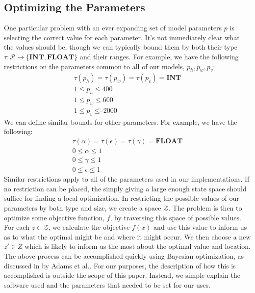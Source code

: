 \documentclass[letterpaper]{article}
\begin{document}
\subsection{Optimizing the Parameters}
\label{sec:bayes_opt}
One particular problem with an ever expanding set of model parameters $p$ is selecting the correct value for each parameter. It's not immediately clear what the values should be, though we can typically bound them by both their type $\tau: \mathcal{P} \to \{\textbf{INT}, \textbf{FLOAT} \}$ and their ranges. For example, we have the following restrictions on the parameters common to all of our models, $p_h,p_w,p_v$:
\begin{align}
\tau(p_h) = \tau(p_w) = \tau(p_v) = \textbf{INT} \\
1 \leq p_h \leq 400 \\
1 \leq p_w \leq 600 \\
1 \leq p_v \leq \tilde~ 2000
\end{align}
We can define similar bounds for other parameters. For example, we have the following:
\begin{align}
\tau(\alpha) = \tau(\epsilon) = \tau(\gamma) = \textbf{FLOAT} \\
0 \leq \alpha \leq 1 \\
0 \leq \gamma \leq 1\\
0 \leq \epsilon \leq 1
\end{align}
Similar restrictions apply to all of the parameters used in our implementations. If no restriction can be placed, the simply giving a large enough state space should suffice for finding a local optimization. In restricting the possible values of our parameters by both type and size, we create a space $\mathcal{Z}$. The problem is then to optimize some objective function, $f$, by traversing this space of possible values. For each $z \in \mathcal{Z}$, we calculate the objective $f(x)$ and use this value to inform us as to what the optimal might be and where it might occur. We then choose a new $z' \in Z$ which is likely to inform us the most about the optimal value and location. \\

The above process can be accomplished quickly using Bayesian optimization, as discussed in by Adams et al.\cite{bayes}. For our purposes, the description of how this is accomplished is outside the scope of this paper. Instead, we simple explain the software used and the parameters that needed to be set for our uses.
\end{document}
